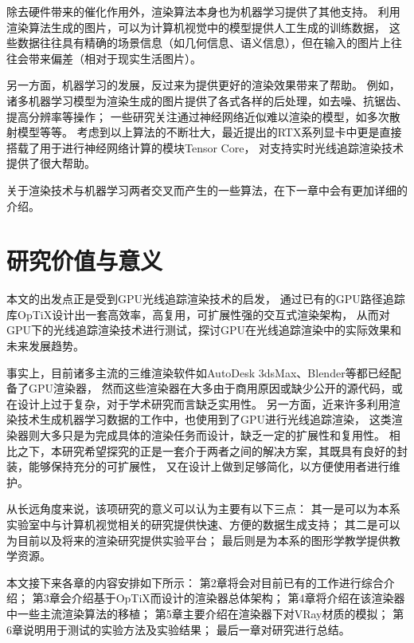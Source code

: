 除去硬件带来的催化作用外，渲染算法本身也为机器学习提供了其他支持。
利用渲染算法生成的图片，可以为计算机视觉中的模型提供人工生成的训练数据，
这些数据往往具有精确的场景信息（如几何信息、语义信息），但在输入的图片上往往会带来偏差（相对于现实生活图片）。

另一方面，机器学习的发展，反过来为提供更好的渲染效果带来了帮助。
例如，诸多机器学习模型为渲染生成的图片提供了各式各样的后处理，如去噪、抗锯齿、提高分辨率等操作；
一些研究关注通过神经网络近似难以渲染的模型，如多次散射模型等等。
考虑到以上算法的不断壮大，最近提出的RTX系列显卡中更是直接搭载了用于进行神经网络计算的模块Tensor Core\cite{RTX}，
对支持实时光线追踪渲染技术提供了很大帮助。

关于渲染技术与机器学习两者交叉而产生的一些算法，在下一章中会有更加详细的介绍。

\section{研究价值与意义}

本文的出发点正是受到GPU光线追踪渲染技术的启发，
通过已有的GPU路径追踪库OpTiX设计出一套高效率，高复用，可扩展性强的交互式渲染架构，
从而对GPU下的光线追踪渲染技术进行测试，探讨GPU在光线追踪渲染中的实际效果和未来发展趋势。

事实上，目前诸多主流的三维渲染软件如AutoDesk 3dsMax、Blender等都已经配备了GPU渲染器，
然而这些渲染器在大多由于商用原因或缺少公开的源代码，或在设计上过于复杂，对于学术研究而言缺乏实用性。
另一方面，近来许多利用渲染技术生成机器学习数据的工作中，也使用到了GPU进行光线追踪渲染，
这类渲染器则大多只是为完成具体的渲染任务而设计，缺乏一定的扩展性和复用性。
相比之下，本研究希望探究的正是一套介于两者之间的解决方案，其既具有良好的封装，能够保持充分的可扩展性，
又在设计上做到足够简化，以方便使用者进行维护。

从长远角度来说，该项研究的意义可以认为主要有以下三点：
其一是可以为本系实验室中与计算机视觉相关的研究提供快速、方便的数据生成支持；
其二是可以为目前以及将来的渲染研究提供实验平台；
最后则是为本系的图形学教学提供教学资源。

本文接下来各章的内容安排如下所示：
第2章将会对目前已有的工作进行综合介绍；
第3章会介绍基于OpTiX而设计的渲染器总体架构；
第4章将介绍在该渲染器中一些主流渲染算法的移植；
第5章主要介绍在渲染器下对VRay材质的模拟；
第6章说明用于测试的实验方法及实验结果；
最后一章对研究进行总结。







